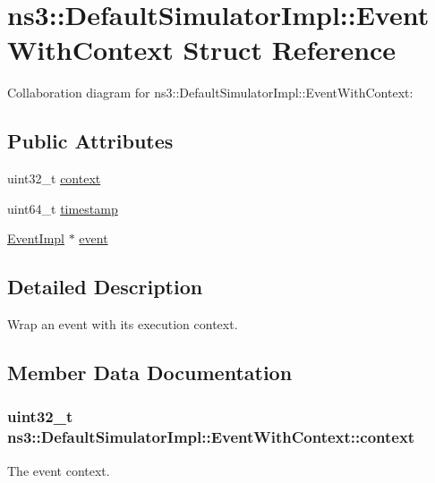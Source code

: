 \hypertarget{structns3_1_1DefaultSimulatorImpl_1_1EventWithContext}{}\section{ns3\+:\+:Default\+Simulator\+Impl\+:\+:Event\+With\+Context Struct Reference}
\label{structns3_1_1DefaultSimulatorImpl_1_1EventWithContext}


Collaboration diagram for ns3\+:\+:Default\+Simulator\+Impl\+:\+:Event\+With\+Context\+:
\subsection*{Public Attributes}
\begin{DoxyCompactItemize}
\item 
uint32\+\_\+t \hyperlink{structns3_1_1DefaultSimulatorImpl_1_1EventWithContext_a9a6565a00d922b6e8ce3c02678837b75}{context}
\item 
uint64\+\_\+t \hyperlink{structns3_1_1DefaultSimulatorImpl_1_1EventWithContext_a5c94e922f4bd0deee72f37e50638afeb}{timestamp}
\item 
\hyperlink{classns3_1_1EventImpl}{Event\+Impl} $\ast$ \hyperlink{structns3_1_1DefaultSimulatorImpl_1_1EventWithContext_ac91ec7aa4ec71759361514ef2481112b}{event}
\end{DoxyCompactItemize}


\subsection{Detailed Description}
Wrap an event with its execution context. 

\subsection{Member Data Documentation}
\subsubsection[{\texorpdfstring{context}{context}}]{\setlength{\rightskip}{0pt plus 5cm}uint32\+\_\+t ns3\+::\+Default\+Simulator\+Impl\+::\+Event\+With\+Context\+::context}\hypertarget{structns3_1_1DefaultSimulatorImpl_1_1EventWithContext_a9a6565a00d922b6e8ce3c02678837b75}{}\label{structns3_1_1DefaultSimulatorImpl_1_1EventWithContext_a9a6565a00d922b6e8ce3c02678837b75}
The event context. 
